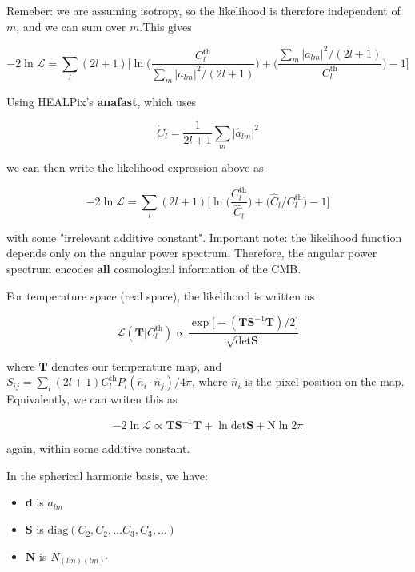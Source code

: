 \documentclass[a4paper, 11pt]{article}
\begin{document}
Remeber: we are assuming isotropy, so the likelihood is therefore independent of $m$, and we can sum over $m$.This gives 

\begin{equation}
-2\ln\mathcal{L} = \sum_{l}(2l+1)\Big[\ln\Big(\frac{C^{\text{th}}_l}{\sum_{m}\vert a_{lm}\vert^2/(2l+1)}\Big)+\Big(\frac{\sum_{m}\vert a_{lm}\vert^2/(2l+1)}{C^{\text{th}}_l}\Big)-1 \Big]
\end{equation}

Using HEALPix's \textbf{anafast}, which uses 

\begin{equation}
\dot{C}_l=\frac{1}{2l+1}\sum_m \vert\hat{a}_{lm}\vert^2
\end{equation}

we can then write the likelihood expression above as 

\begin{equation}
-2\ln\mathcal{L} = \sum_{l}(2l+1)\Big[\ln\Big( \frac{C^{\text{th}}_l}{\hat{C}_l}\Big) +\Big(\hat{C}_l/C^{\text{th}}_l\Big)-1 \Big]
\end{equation}

with some "irrelevant additive constant". Important note: the likelihood function depends only on the angular power spectrum. Therefore, the angular power spectrum encodes $\textbf{all}$ cosmological information of the CMB.

For temperature space (real space), the likelihood is written as 

\begin{equation}
\mathcal{L}(\textbf{T}\vert C^{\text{th}}_l)\propto \frac{\exp\big[-(\textbf{T}\textbf{S}^{-1}\textbf{T})/2\big]}{\sqrt{\text{det}\textbf{S}}}
\end{equation}

where $\textbf{T}$ denotes our temperature map, and $S_{ij}=\sum_l(2l+1)C^{\text{th}}_l P_l(\hat{n}_i\cdot\hat{n}_j)/4\pi$, where $\hat{n}_i$ is the pixel position on the map. Equivalently, we can writen this as

\begin{equation}
-2 \ln\mathcal{L}\propto\textbf{T}\textbf{S}^{-1}\textbf{T}+\ln\text{det}\textbf{S}+\text{N}\ln2\pi
\end{equation}

again, within some additive constant. 

In the spherical harmonic basis, we have: 
\begin{itemize}
\item[]\textbf{d} is $a_{lm}$
\item[]\textbf{S} is $\text{diag}(C_2, C_2,\dots C_3, C_3, \dots)$
\item[]\textbf{N} is $N_{(lm)(lm)'}$
\end{itemize}
\end{document}

